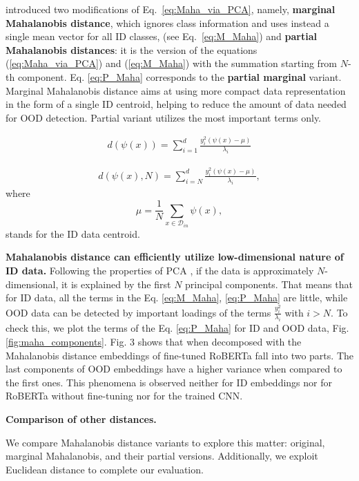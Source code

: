 \documentclass[letterpaper, final]{article} %
\begin{document}
\citet*{Kamoi2020WhyIT} introduced two modifications of Eq.~\ref{eq:Maha_via_PCA}, namely, {\bf marginal Mahalanobis distance}, which  ignores class information and uses instead a single mean vector for all ID classes, (see Eq.~\ref{eq:M_Maha}) and {\bf partial Mahalanobis distances}: it is the version of the equations (\ref{eq:Maha_via_PCA}) and (\ref{eq:M_Maha}) with the summation starting from $N$-th component. Eq. \ref{eq:P_Maha} corresponds to the {\bf partial marginal} variant. Marginal Mahalanobis distance aims at using more compact data representation in the form of a single ID centroid, helping to reduce the amount of data needed for OOD detection. Partial variant utilizes  the most important terms only.

\begin{equation}
\begin{gathered}
d(\psi(x))=\sum\limits_{i=1}^{d}\frac{y_i^2(\psi(x)-\mu)}{\lambda_i}
\end{gathered}
\label{eq:M_Maha}
\end{equation}

\begin{equation}
\begin{gathered}
d(\psi(x), N) = \sum\limits_{i=N}^{d} \frac{y_i^2(\psi(x)-\mu)}{\lambda_i},
\end{gathered}
\label{eq:P_Maha}
\end{equation}
where
$$
\mu  = \frac{1}{N}\sum\limits_{x\in\mathcal{D}_{in}} \psi(x),
$$
stands for the ID data centroid.

{\bf Mahalanobis distance can efficiently utilize low-dimensional nature of ID data.}
Following the properties of PCA \cite{murphy2012machine}, if the data is approximately $N$-dimensional, it is explained by the first $N$ principal components. That means that for ID data, all the terms in the Eq. \ref{eq:M_Maha}, \ref{eq:P_Maha} are little, while OOD data can be detected by important loadings of the terms $\frac{y_i^2}{\lambda_i}$ with $i>N$.
To check this, we plot the terms of the Eq. \ref{eq:P_Maha} for ID and OOD data, Fig. \ref{fig:maha_components}. Fig. 3 shows that when decomposed with the Mahalanobis distance embeddings of fine-tuned RoBERTa fall into two parts. The last components of OOD embeddings have a higher variance when compared to the first ones. This phenomena is observed neither for ID embeddings nor for RoBERTa without fine-tuning nor for the trained CNN.


{\bf Comparison of other distances.}

We compare Mahalanobis distance variants to explore this matter: original, marginal Mahalanobis, and their partial versions. Additionally, we exploit Euclidean distance to complete our evaluation.
\end{document}
